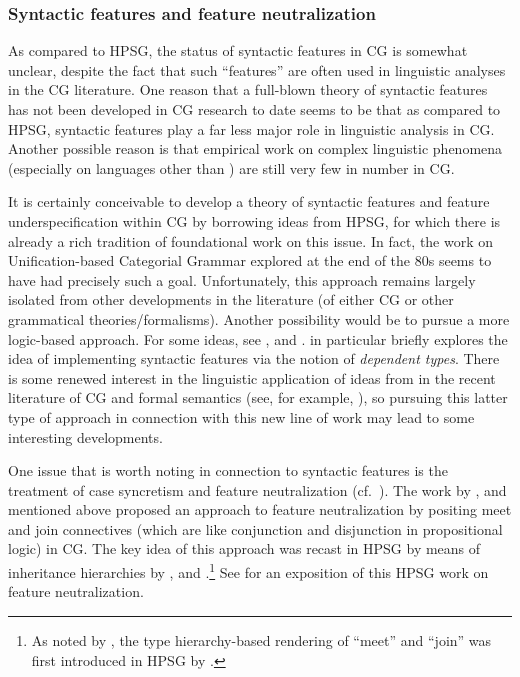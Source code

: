 \documentclass[output=paper,biblatex,babelshorthands,newtxmath,draftmode,colorlinks,citecolor=brown]{langscibook}
\begin{document}
\subsubsection{Syntactic features and feature neutralization}

As compared to HPSG, the status of syntactic features in CG is
somewhat unclear, despite the fact that such ``features'' are often used
in linguistic analyses in the CG literature. One reason that a
full-blown theory of syntactic features has not been developed in CG
research to date seems to be that as compared to HPSG, syntactic
features play a far less major role in linguistic analysis in CG.
Another possible reason is that empirical work on complex linguistic
phenomena (especially on languages other than ) are still very
few in number in CG. 

It is certainly conceivable to develop a theory of syntactic features
and feature underspecification within CG by borrowing ideas from HPSG,
for which there is already a rich tradition of foundational work on this
issue. In fact, the work on Unification-based Categorial Grammar
\citep*{CalderEA1988} explored at the end of the 80s seems to have had
precisely such a goal. Unfortunately, this approach remains largely
isolated from other developments in the literature (of either CG or
other grammatical theories/formalisms). Another possibility would be to pursue a
more logic-based approach. For some ideas, see \citet{BJ95},
\citet{Bayer96}
and \citet{Morrill94a-u}. \citet[Chapter~6]{Morrill94a-u} in particular briefly
explores the idea of implementing syntactic features via the notion of
\emph{dependent types}. There is some renewed interest in
the linguistic application of ideas from  \citep{MartinLofIntuitionistic} in the recent literature
of CG and formal semantics (see, for example,
\citealt{ChatzikyriakidisLuo2017}), so pursuing this latter type of
approach in connection with this new line of work may lead to some
interesting developments.

One issue that is worth noting in connection to syntactic features is
the treatment of case syncretism and feature neutralization
(cf.~). The work by
\citet[Chapter~6]{Morrill94a-u}, \citet{Bayer96} and \citet{BJ95} mentioned
above proposed an approach
to feature neutralization by positing meet and join connectives (which
are like conjunction and disjunction in propositional logic) in CG.
The key idea of this approach was recast in HPSG by means of
inheritance hierarchies by \citet{levy:01}, \citet{lev:pol:01} and
\citet{dani:01}.\footnote{As noted by \citet{levy:01}, the
  type hierarchy-based rendering of ``meet'' and ``join''
  was first introduced in HPSG by \citet*[Section~6.3.2]{LHC2001a-u}.} See
 for an 
exposition of this HPSG work on feature neutralization.
\end{document}
